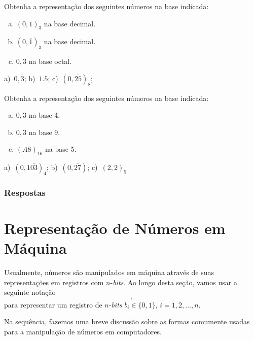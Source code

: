 \begin{exer}
  Obtenha a representação dos seguintes números na base indicada:
  \begin{enumerate}[a)]
  \item $(0,1)_3$ na base decimal.
  \item $(0,\overline{1})_3$ na base decimal.
  \item $0,\overline{3}$ na base octal.
  \end{enumerate}
\end{exer}
\begin{resp}
  a)~$0,\overline{3}$; b)~$1.5$; c)~$(0,\overline{25})_8$;
\end{resp}

\begin{exer}
  Obtenha a representação dos seguintes números na base indicada:
  \begin{enumerate}[a)]
  \item $0,3$ na base 4.
  \item $0,3$ na base 9.
  \item $(A8)_{16}$ na base 5.
  \end{enumerate}
\end{exer}
\begin{resp}
  a)~$(0,1\overline{03})_4$; b)~$(0,\overline{27})$; c)~$(2,2)_5$
\end{resp}

\ifisbook
\subsubsection{Respostas}
\shipoutAnswer
\fi


\section{Representação de Números em Máquina}\label{cap_artm_sec_repummaq}

Usualmente, números são manipulados em máquina através de suas representações em registros com $n$-{\it bits}. Ao longo desta seção, vamos usar a seguinte notação
\begin{equation}
  [b_1 ~ b_2 ~ b_3 ~ \cdots ~ b_n],
\end{equation}
para representar um registro de $n$-{\it bits} $b_i\in\{0, 1\}$, $i=1, 2, \dotsc, n$.

Na sequência, fazemos uma breve discussão sobre as formas comumente usadas para a manipulação de números em computadores.

